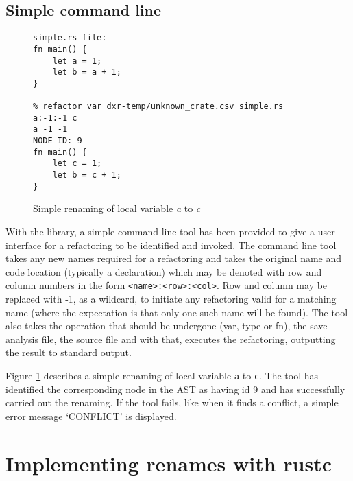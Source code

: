 \subsection{Simple command line}

\begin{figure}[H]
\centering

\begin{verbatim}
simple.rs file:
fn main() {
    let a = 1;
    let b = a + 1;
}

% refactor var dxr-temp/unknown_crate.csv simple.rs  a:-1:-1 c
a -1 -1
NODE ID: 9
fn main() {
    let c = 1;
    let b = c + 1;
}
\end{verbatim}

\caption{Simple renaming of local variable \emph{a} to \emph{c}}
\label{Fig:cmdrename}
\end{figure}


With the library, a simple command line tool has been provided to give a user interface for a refactoring to be identified and invoked. The command line tool takes any new names required for a refactoring and takes the original name and code location (typically a declaration) which may be denoted with row and column numbers in the form {\verb|<name>:<row>:<col>|}. Row and column may be replaced with -1, as a wildcard, to initiate any refactoring valid for a matching name (where the expectation is that only one such name will be found). The tool also takes the operation that should be undergone (var, type or fn), the save-analysis file, the source file and with that, executes the refactoring, outputting the result to standard output.



Figure \ref{Fig:cmdrename} describes a simple renaming of local variable {\verb|a|} to {\verb|c|}. The tool has identified the corresponding node in the AST as having id 9 and has successfully carried out the renaming. If the tool fails, like when it finds a conflict, a simple error message `CONFLICT' is displayed.


\section{Implementing renames with rustc}\label{S:building}
